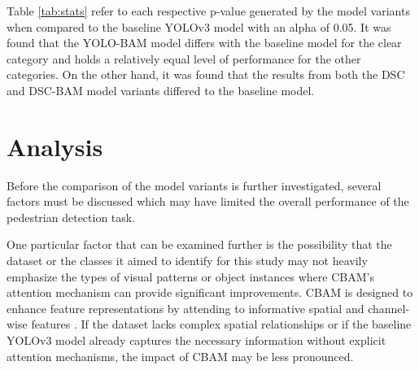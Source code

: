 
\begin{table}[]
\centering
\caption{Model variants two-tailed paired t-test p-value results}
\label{tab:stats}
\end{table}


Table \ref{tab:stats} refer to each respective p-value generated by the model variants when compared to the baseline YOLOv3 model with an alpha of 0.05. It was found that the YOLO-BAM model differs with the baseline model for the clear category and holds a relatively equal level of performance for the other categories. On the other hand, it was found that the results from both the DSC and DSC-BAM model variants differed to the baseline model.

\section{Analysis}
Before the comparison of the model variants is further investigated, several factors must be discussed which may have limited the overall performance of the pedestrian detection task.

One particular factor that can be examined further is the possibility that the dataset or the classes it aimed to identify for this study may not heavily emphasize the types of visual patterns or object instances where CBAM's attention mechanism can provide significant improvements. CBAM is designed to enhance feature representations by attending to informative spatial and channel-wise features \cite{wooCBAMConvolutionalBlock2018}. If the dataset lacks complex spatial relationships or if the baseline YOLOv3 model already captures the necessary information without explicit attention mechanisms, the impact of CBAM may be less pronounced.

